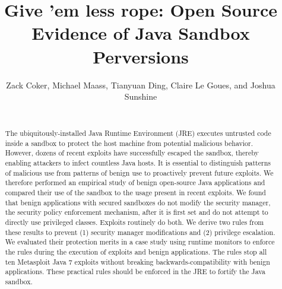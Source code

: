 \documentclass{sig-alternate}
\begin{document}
\lstset{language=Java}

\title{Give 'em less rope: Open Source Evidence of Java Sandbox Perversions}

\author{\alignauthor Zack Coker, Michael Maass, Tianyuan Ding, Claire Le Goues, and Joshua Sunshine \\
 \\
} 

\maketitle
\thispagestyle{plain} 
\pagestyle{plain}
\begin{abstract}
The ubiquitously-installed Java Runtime Environment (JRE) executes
untrusted code inside a sandbox to protect the host machine from potential
malicious behavior. However, dozens of recent exploits have successfully
escaped the sandbox, thereby enabling attackers to infect countless
Java hosts. It is essential to distinguish patterns of malicious use
from patterns of benign use to proactively prevent future exploits.
We therefore performed an empirical study of benign open-source Java
applications and compared their use of the sandbox to the usage present
in recent exploits. We found that benign applications with secured
sandboxes do not modify the security manager, the security policy
enforcement mechanism, after it is first set and do not attempt to
directly use privileged classes. Exploits routinely do both. We derive two rules from these results to prevent (1) security manager modifications and (2) privilege escalation. We evaluated their protection merits in a case study using runtime monitors to enforce the rules during the execution of exploits and benign applications. The rules stop all ten Metasploit Java 7 exploits without breaking backwards-compatibility with benign applications. These practical rules should be enforced in the JRE to fortify the Java sandbox.
\end{abstract}
\end{document}
